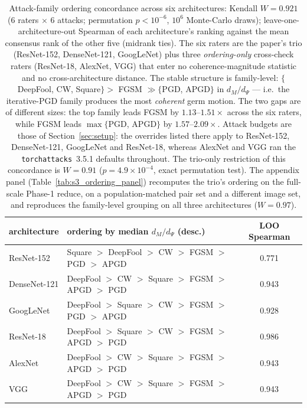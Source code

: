 \begin{table}[t]
\centering\small
\begin{tabular}{llc}
\toprule
architecture & ordering by median $d_M/d_\Psi$ (desc.) & LOO Spearman \\
\midrule
ResNet-152 & Square $>$ DeepFool $>$ CW $>$ FGSM $>$ PGD $>$ APGD & 0.771 \\
DenseNet-121 & DeepFool $>$ CW $>$ Square $>$ FGSM $>$ APGD $>$ PGD & 0.943 \\
GoogLeNet & DeepFool $>$ Square $>$ CW $>$ FGSM $>$ PGD $>$ APGD & 0.928 \\
ResNet-18 & DeepFool $>$ Square $>$ CW $>$ FGSM $>$ APGD $>$ PGD & 0.986 \\
AlexNet & DeepFool $>$ CW $>$ Square $>$ FGSM $>$ APGD $>$ PGD & 0.943 \\
VGG & DeepFool $>$ CW $>$ Square $>$ FGSM $>$ APGD $>$ PGD & 0.943 \\
\bottomrule
\end{tabular}
\caption{Attack-family ordering concordance across six architectures: Kendall $W=0.921$
(6 raters $\times$ 6 attacks; permutation $p<10^{-6}$, $10^6$ Monte-Carlo draws); leave-one-architecture-out
Spearman of each architecture's ranking against
the mean consensus rank of the other five (midrank ties). The six raters are the paper's trio
(ResNet-152, DenseNet-121, GoogLeNet) plus three \emph{ordering-only} cross-check raters (ResNet-18,
AlexNet, VGG) that enter no coherence-magnitude statistic and no cross-architecture distance. The stable
structure is family-level: $\{$DeepFool, CW, Square$\}>$ FGSM $\gg\{$PGD, APGD$\}$ in $d_M/d_\Psi$ --- i.e.\
the iterative-PGD family produces the most \emph{coherent} germ motion. The two gaps are of different
sizes: the top family leads FGSM by $1.13$--$1.51\times$ across the six raters, while FGSM leads
$\max\{$PGD, APGD$\}$ by $1.57$--$2.09\times$. Attack budgets are those of Section~\ref{sec:setup}: the
overrides listed there apply to ResNet-152, DenseNet-121, GoogLeNet and ResNet-18, whereas AlexNet and
VGG ran the \texttt{torchattacks}~3.5.1 defaults throughout. The trio-only restriction of this
concordance is $W=0.91$ ($p=4.9\times10^{-4}$, exact permutation test). The appendix panel
(Table~\ref{tab:s3_ordering_panel}) recomputes the trio's ordering on the full-scale Phase-1 reduce, on
a population-matched pair set and a different image set, and reproduces the family-level grouping on all
three architectures ($W=0.97$).}
\label{tab:ordering}
\end{table}
